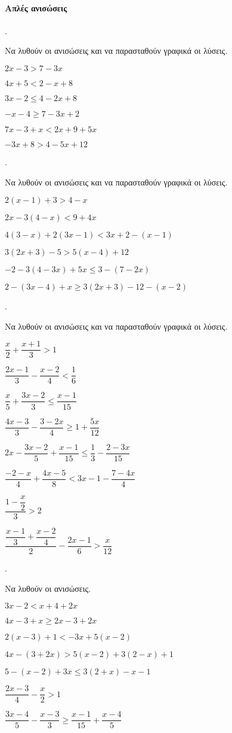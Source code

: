 \documentclass[11pt,a4paper,twocolumn]{article}
\newcounter{askhsh}
\newcommand{\askhsh}{{\large\theaskhsh.}\ \addtocounter{askhsh}{1}}
\begin{document}
\paragraph{Απλές ανισώσεις}
\askhsh Να λυθούν οι ανισώσεις και να παρασταθούν γραφικά οι λύσεις.
\begin{alist}
\item $ 2x-3>7-3x $
\item $ 4x+5<2-x+8 $
\item $ 3x-2\leq4-2x+8 $
\item $ -x-4\geq7-3x+2 $
\item $ 7x-3+x<2x+9+5x $
\item $ -3x+8>4-5x+12 $
\end{alist}
\askhsh Να λυθούν οι ανισώσεις και να παρασταθούν γραφικά οι λύσεις.
\begin{alist}
\item $ 2(x-1)+3>4-x $
\item $ 2x-3(4-x)<9+4x $
\item $ 4(3-x)+2(3x-1)<3x+2-(x-1) $
\item $ 3(2x+3)-5>5(x-4)+12 $
\item $ -2-3(4-3x)+5x\leq3-(7-2x) $
\item $ 2-(3x-4)+x\geq3(2x+3)-12-(x-2) $
\end{alist}
\askhsh Να λυθούν οι ανισώσεις και να παρασταθούν γραφικά οι λύσεις.
\begin{alist}
\item $ \dfrac{x}{2}+\dfrac{x+1}{3}>1 $
\item $ \dfrac{2x-1}{3}-\dfrac{x-2}{4}<\dfrac{1}{6} $
\item $ \dfrac{x}{5}+\dfrac{3x-2}{3}\leq\dfrac{x-1}{15} $
\item $ \dfrac{4x-3}{3}-\dfrac{3-2x}{4}\geq1+\dfrac{5x}{12} $
\item $ 2x-\dfrac{3x-2}{5}+\dfrac{x-1}{15}\leq\dfrac{1}{3}-\dfrac{2-3x}{15} $
\item $ \dfrac{-2-x}{4}+\dfrac{4x-5}{8}<3x-1-\dfrac{7-4x}{4} $
\item $ \dfrac{1-\dfrac{x}{2}}{3}>2 $
\item $ \dfrac{\dfrac{x-1}{3}+\dfrac{x-2}{4}}{2}-\dfrac{2x-1}{6}>\dfrac{x}{12} $
\end{alist}
\askhsh Να λυθούν οι ανισώσεις.
\begin{alist}
\item $ 3x-2<x+4+2x $
\item $ 4x-3+x\geq2x-3+2x $
\item $ 2(x-3)+1<-3x+5(x-2) $
\item $ 4x-(3+2x)>5(x-2)+3(2-x)+1 $
\item $ 5-(x-2)+3x\leq3(2+x)-x-1 $
\item $ \dfrac{2x-3}{4}-\dfrac{x}{2}>1 $
\item $ \dfrac{3x-4}{5}-\dfrac{x-3}{3}\geq\dfrac{x-1}{15}+\dfrac{x-4}{5} $
\end{alist}
\end{document}
